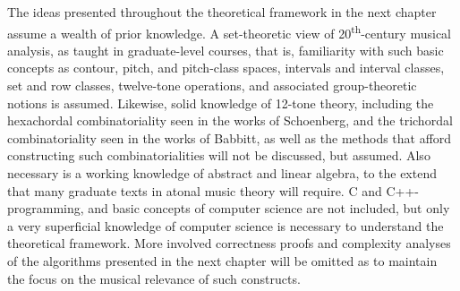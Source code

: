 The ideas presented throughout the theoretical framework in the next chapter assume a wealth of prior knowledge. A set-theoretic view of 20\textsuperscript{th}-century musical analysis, as taught in graduate-level courses, that is, familiarity with such basic concepts as contour, pitch, and pitch-class spaces, intervals and interval classes, set and row classes, twelve-tone operations, and associated group-theoretic notions is assumed. Likewise, solid knowledge of 12-tone theory, including the hexachordal combinatoriality seen in the works of Schoenberg, and the trichordal combinatoriality seen in the works of Babbitt, as well as the methods that afford constructing such combinatorialities will not be discussed, but assumed. Also necessary is a working knowledge of abstract and linear algebra, to the extend that many graduate texts in atonal music theory will require. C and C++-programming, and basic concepts of computer science are not included, but only a very superficial knowledge of computer science is necessary to understand the theoretical framework. More involved correctness proofs and complexity analyses of the algorithms presented in the next chapter will be omitted as to maintain the focus on the musical relevance of such constructs.
